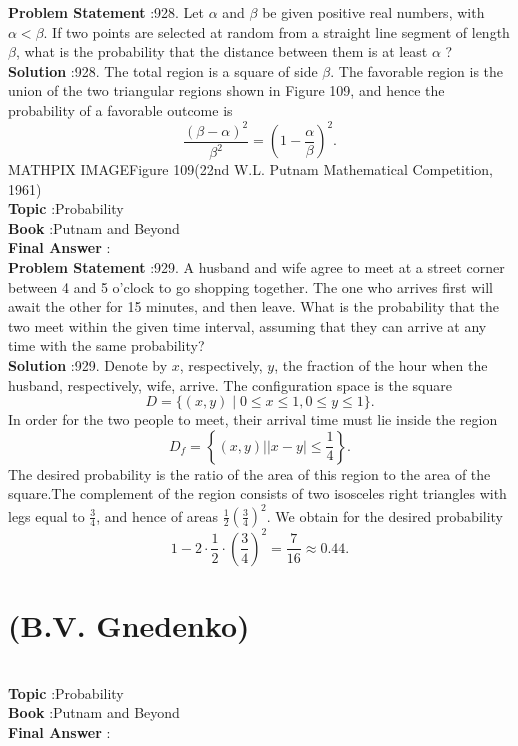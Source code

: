 \documentclass[10pt]{article}
\begin{document}
\textbf{Problem Statement} :928. Let $\alpha$ and $\beta$ be given positive real numbers, with $\alpha<\beta$. If two points are selected at random from a straight line segment of length $\beta$, what is the probability that the distance between them is at least $\alpha$ ?\\
\textbf{Solution} :928. The total region is a square of side $\beta$. The favorable region is the union of the two triangular regions shown in Figure 109, and hence the probability of a favorable outcome is$$ \frac{(\beta-\alpha)^{2}}{\beta^{2}}=\left(1-\frac{\alpha}{\beta}\right)^{2} . $$MATHPIX IMAGEFigure 109(22nd W.L. Putnam Mathematical Competition, 1961)\\
\textbf{Topic} :Probability\\
\textbf{Book} :Putnam and Beyond\\
\textbf{Final Answer} :\\


\textbf{Problem Statement} :929. A husband and wife agree to meet at a street corner between 4 and 5 o'clock to go shopping together. The one who arrives first will await the other for 15 minutes, and then leave. What is the probability that the two meet within the given time interval, assuming that they can arrive at any time with the same probability? \\
\textbf{Solution} :929. Denote by $x$, respectively, $y$, the fraction of the hour when the husband, respectively, wife, arrive. The configuration space is the square $$ D=\{(x, y) \mid 0 \leq x \leq 1,0 \leq y \leq 1\} . $$In order for the two people to meet, their arrival time must lie inside the region$$ D_{f}=\left\{(x, y)|| x-y \mid \leq \frac{1}{4}\right\} . $$The desired probability is the ratio of the area of this region to the area of the square.The complement of the region consists of two isosceles right triangles with legs equal to $\frac{3}{4}$, and hence of areas $\frac{1}{2}\left(\frac{3}{4}\right)^{2}$. We obtain for the desired probability$$ 1-2 \cdot \frac{1}{2} \cdot\left(\frac{3}{4}\right)^{2}=\frac{7}{16} \approx 0.44 . $$\section{(B.V. Gnedenko)}\\
\textbf{Topic} :Probability\\
\textbf{Book} :Putnam and Beyond\\
\textbf{Final Answer} :\\
\end{document}

